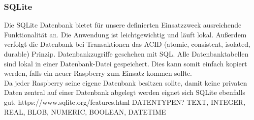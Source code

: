 \subsubsection{SQLite}
Die SQLite Datenbank bietet für unsere definierten Einsatzzweck ausreichende Funktionalität an. Die Anwendung ist leichtgewichtig und läuft lokal. Außerdem verfolgt die Datenbank bei Transaktionen das ACID (atomic, consistent, isolated, durable) Prinzip. Datenbankzugriffe geschehen mit SQL. Alle Datenbanktabellen sind lokal in einer Datenbank-Datei gespeichert. Dies kann somit einfach kopiert werden, falls ein neuer Raspberry zum Einsatz kommen sollte.\\
Da jeder Raspberry seine eigene Datenbank besitzen sollte, damit keine privaten Daten zentral auf einer Datenbank abgelegt werden eignet sich SQLite ebenfalls gut.   https://www.sqlite.org/features.html
DATENTYPEN? TEXT, INTEGER, REAL, BLOB, NUMERIC, BOOLEAN, DATETIME 


